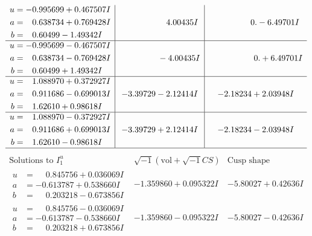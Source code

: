 \documentclass[1p]{elsarticle_modified}
\theoremstyle{definition}
\newcommand{\I}{\sqrt{-1}}
\begin{document}
$$\begin{array}{c|c|c}
\begin{aligned}
u &= -0.995699 + 0.467507 I \\
a &= \phantom{-}0.638734 + 0.769428 I \\
b &= \phantom{-}0.60499 - 1.49342 I\end{aligned}
 & \phantom{-0.000000 -}4.00435 I & \phantom{-0.000000 } 0. - 6.49701 I \\ \hline\begin{aligned}
u &= -0.995699 - 0.467507 I \\
a &= \phantom{-}0.638734 - 0.769428 I \\
b &= \phantom{-}0.60499 + 1.49342 I\end{aligned}
 & \phantom{-0.000000 } -4.00435 I & \phantom{-0.000000 -}0. + 6.49701 I \\ \hline\begin{aligned}
u &= \phantom{-}1.088970 + 0.372927 I \\
a &= \phantom{-}0.911686 - 0.699013 I \\
b &= \phantom{-}1.62610 + 0.98618 I\end{aligned}
 & -3.39729 - 2.12414 I & -2.18234 + 2.03948 I \\ \hline\begin{aligned}
u &= \phantom{-}1.088970 - 0.372927 I \\
a &= \phantom{-}0.911686 + 0.699013 I \\
b &= \phantom{-}1.62610 - 0.98618 I\end{aligned}
 & -3.39729 + 2.12414 I & -2.18234 - 2.03948 I\\
 \hline 
 \end{array}$$\newpage$$\begin{array}{c|c|c}  
\text{Solutions to }I^u_{1}& \I (\text{vol} + \sqrt{-1}CS) & \text{Cusp shape}\\
 \hline 
\begin{aligned}
u &= \phantom{-}0.845756 + 0.036069 I \\
a &= -0.613787 + 0.538660 I \\
b &= \phantom{-}0.203218 - 0.673856 I\end{aligned}
 & -1.359860 + 0.095322 I & -5.80027 + 0.42636 I \\ \hline\begin{aligned}
u &= \phantom{-}0.845756 - 0.036069 I \\
a &= -0.613787 - 0.538660 I \\
b &= \phantom{-}0.203218 + 0.673856 I\end{aligned}
 & -1.359860 - 0.095322 I & -5.80027 - 0.42636 I \\ \hline\begin{aligned}

\end{aligned}
\end{array}$$
\end{document}
